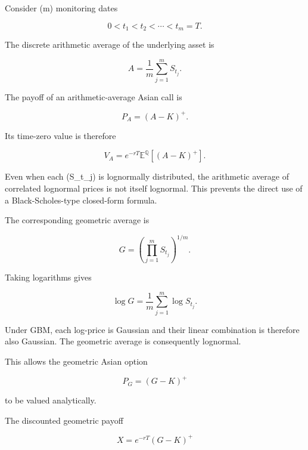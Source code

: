 \documentclass[12pt,a4paper]{report}
\begin{document}
Consider (m) monitoring dates

\begin{equation}
0<t_1<t_2<\cdots<t_m=T.
\end{equation}

The discrete arithmetic average of the underlying asset is

\begin{equation}
A
=
\frac{1}{m}
\sum_{j=1}^{m}
S_{t_j}.
\end{equation}

The payoff of an arithmetic-average Asian call is

\begin{equation}
P_A
=
(A-K)^+.
\end{equation}

Its time-zero value is therefore

\begin{equation}
V_A
=
e^{-rT}
\mathbb{E}^{\mathbb{Q}}
\left[
(A-K)^+
\right].
\end{equation}

Even when each (S_{t_j}) is lognormally distributed, the arithmetic average of correlated lognormal prices is not itself lognormal. This prevents the direct use of a Black-Scholes-type closed-form formula.

The corresponding geometric average is

\begin{equation}
G
=
\left(
\prod_{j=1}^{m}
S_{t_j}
\right)^{1/m}.
\end{equation}

Taking logarithms gives

\begin{equation}
\log G
=
\frac{1}{m}
\sum_{j=1}^{m}
\log S_{t_j}.
\end{equation}

Under GBM, each log-price is Gaussian and their linear combination is therefore also Gaussian. The geometric average is consequently lognormal.

This allows the geometric Asian option

\begin{equation}
P_G
=
(G-K)^+
\end{equation}

to be valued analytically.

The discounted geometric payoff

\begin{equation}
X
=
e^{-rT}(G-K)^+
\end{equation}
\end{document}
